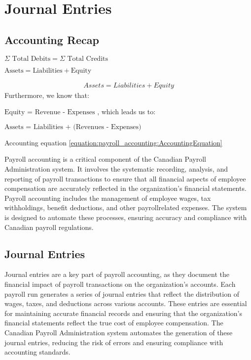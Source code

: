 \documentclass[letterpaper,10pt,english]{sphinxmanual}
\begin{document}
\section{Journal Entries}
\label{\detokenize{payroll_accounting:journal-entries}}

\subsection{Accounting Recap}
\label{\detokenize{payroll_accounting:accounting-recap}}
\begin{center}\(\Sigma \text{ Total Debits} = \Sigma \text{ Total Credits}\)
\end{center}
\begin{center}\(\text{Assets} = \text{Liabilities} + \text{Equity}\)
\end{center}\begin{equation}\label{equation:payroll_accounting:AccountingEquation}
\begin{split}Assets = Liabilities + Equity\end{split}
\end{equation}
\sphinxAtStartPar
Furthermore, we know that:

\begin{center}\(\text{Equity = Revenue - Expenses}\)
, which leads us to:
\end{center}
\begin{center}\(\text{Assets = Liabilities + (Revenues - Expenses)}\)
\end{center}
\sphinxAtStartPar
Accounting equation \eqref{equation:payroll_accounting:AccountingEquation}

\sphinxAtStartPar
Payroll accounting is a critical component of the Canadian Payroll Administration system. It involves the systematic recording, analysis, and reporting of payroll transactions to ensure that all financial aspects of employee compensation are accurately reflected in the organization’s financial statements.
Payroll accounting includes the management of employee wages, tax withholdings, benefit deductions, and other payroll\sphinxhyphen{}related expenses. The system is designed to automate these processes, ensuring accuracy and compliance with Canadian payroll regulations.


\subsection{Journal Entries}
\label{\detokenize{payroll_accounting:id1}}
\sphinxAtStartPar
Journal entries are a key part of payroll accounting, as they document the financial impact of payroll transactions on the organization’s accounts. Each payroll run generates a series of journal entries that reflect the distribution of wages, taxes, and deductions across various accounts.
These entries are essential for maintaining accurate financial records and ensuring that the organization’s financial statements reflect the true cost of employee compensation. The Canadian Payroll Administration system automates the generation of these journal entries, reducing the risk of errors and ensuring compliance with accounting standards.
\end{document}
